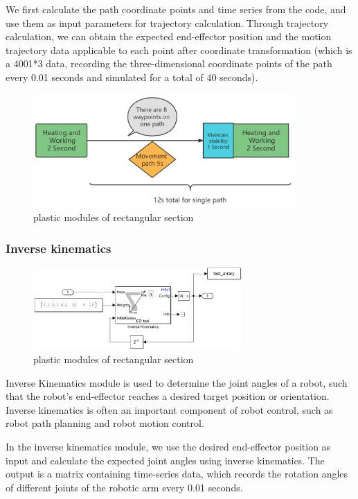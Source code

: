 We first calculate the path coordinate points and time series from the code, and use them as input parameters for trajectory calculation. Through trajectory calculation, we can obtain the expected end-effector position and the motion trajectory data applicable to each point after coordinate transformation (which is a 4001*3 data, recording the three-dimensional coordinate points of the path every 0.01 seconds and simulated for a total of 40 seconds).

\begin{figure}[htbp]
	\centering
	\includegraphics[width=10cm]{./fig/siwei.png}
	\caption{plastic modules of rectangular section  }
	\label{F 5.3}
\end{figure}


\subsubsection*{Inverse kinematics}

\begin{figure}[htbp]
    \centering
    \includegraphics[width=8cm]{./fig/IK.png}
    \caption{plastic modules of rectangular section  }
    \label{f1}
\end{figure}

Inverse Kinematics module is used to determine the joint angles of a robot, such that the robot's end-effector reaches a desired target position or orientation. Inverse kinematics is often an important component of robot control, such as robot path planning and robot motion control.

In the inverse kinematics module, we use the desired end-effector position as input and calculate the expected joint angles using inverse kinematics. The output is a matrix containing time-series data, which records the rotation angles of different joints of the robotic arm every 0.01 seconds.


